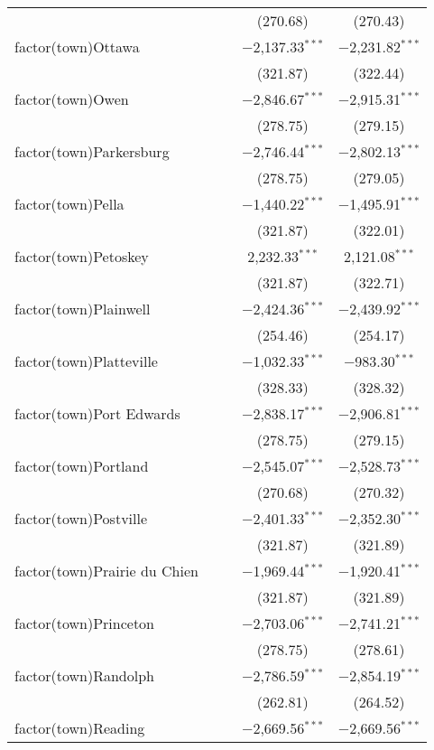 \begin{table}[!htbp]
\begin{tabular}{@{\extracolsep{5pt}}lcccc}
  &  &  & (270.68) & (270.43) \\ 
  factor(town)Ottawa &  &  & $-$2,137.33$^{***}$ & $-$2,231.82$^{***}$ \\ 
  &  &  & (321.87) & (322.44) \\ 
  factor(town)Owen &  &  & $-$2,846.67$^{***}$ & $-$2,915.31$^{***}$ \\ 
  &  &  & (278.75) & (279.15) \\ 
  factor(town)Parkersburg &  &  & $-$2,746.44$^{***}$ & $-$2,802.13$^{***}$ \\ 
  &  &  & (278.75) & (279.05) \\ 
  factor(town)Pella &  &  & $-$1,440.22$^{***}$ & $-$1,495.91$^{***}$ \\ 
  &  &  & (321.87) & (322.01) \\ 
  factor(town)Petoskey &  &  & 2,232.33$^{***}$ & 2,121.08$^{***}$ \\ 
  &  &  & (321.87) & (322.71) \\ 
  factor(town)Plainwell &  &  & $-$2,424.36$^{***}$ & $-$2,439.92$^{***}$ \\ 
  &  &  & (254.46) & (254.17) \\ 
  factor(town)Platteville &  &  & $-$1,032.33$^{***}$ & $-$983.30$^{***}$ \\ 
  &  &  & (328.33) & (328.32) \\ 
  factor(town)Port Edwards &  &  & $-$2,838.17$^{***}$ & $-$2,906.81$^{***}$ \\ 
  &  &  & (278.75) & (279.15) \\ 
  factor(town)Portland &  &  & $-$2,545.07$^{***}$ & $-$2,528.73$^{***}$ \\ 
  &  &  & (270.68) & (270.32) \\ 
  factor(town)Postville &  &  & $-$2,401.33$^{***}$ & $-$2,352.30$^{***}$ \\ 
  &  &  & (321.87) & (321.89) \\ 
  factor(town)Prairie du Chien &  &  & $-$1,969.44$^{***}$ & $-$1,920.41$^{***}$ \\ 
  &  &  & (321.87) & (321.89) \\ 
  factor(town)Princeton &  &  & $-$2,703.06$^{***}$ & $-$2,741.21$^{***}$ \\ 
  &  &  & (278.75) & (278.61) \\ 
  factor(town)Randolph &  &  & $-$2,786.59$^{***}$ & $-$2,854.19$^{***}$ \\ 
  &  &  & (262.81) & (264.52) \\ 
  factor(town)Reading &  &  & $-$2,669.56$^{***}$ & $-$2,669.56$^{***}$ \\ 

\end{tabular}
\end{table}
